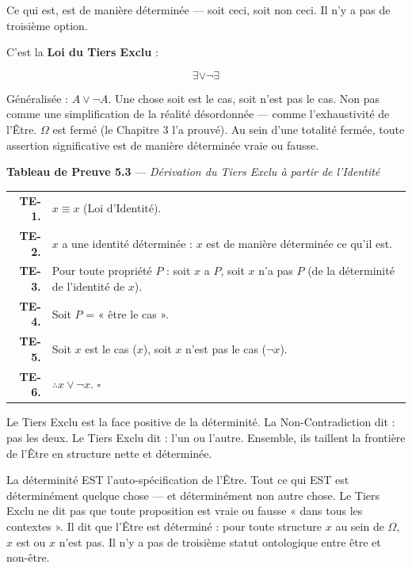 \documentclass[10pt, openany, oneside]{book}
\renewcommand{\footnotesize}{\fontsize{8.5}{11}\selectfont}
\begin{document}
\vspace{1em}

\noindent Ce qui est, est de manière déterminée --- soit ceci, soit non ceci. Il n'y a pas de troisième option.

C'est la \textbf{Loi du Tiers Exclu} :

$$\exists \vee \neg\exists$$

Généralisée : $A \vee \neg A$. Une chose soit est le cas, soit n'est pas le cas. Non pas comme une simplification de la réalité désordonnée --- comme l'exhaustivité de l'Être. $\Omega$ est fermé (le Chapitre 3 l'a prouvé). Au sein d'une totalité fermée, toute assertion significative est de manière déterminée vraie ou fausse.

\vspace{0.5em}

\textbf{Tableau de Preuve 5.3} --- \textit{Dérivation du Tiers Exclu à partir de l'Identité}

\vspace{0.5em}

{\footnotesize
\noindent\begin{tabular}{r p{}}
\textbf{TE-1.} & $x \equiv x$ (Loi d'Identité). \\[0.3em]
\textbf{TE-2.} & $x$ a une identité déterminée : $x$ est de manière déterminée ce qu'il est. \\[0.3em]
\textbf{TE-3.} & Pour toute propriété $P$ : soit $x$ a $P$, soit $x$ n'a pas $P$ (de la déterminité de l'identité de $x$). \\[0.3em]
\textbf{TE-4.} & Soit $P$ = « être le cas ». \\[0.3em]
\textbf{TE-5.} & Soit $x$ est le cas ($x$), soit $x$ n'est pas le cas ($\neg x$). \\[0.3em]
\textbf{TE-6.} & $\therefore x \vee \neg x$. $\square$ \\[0.3em]
\end{tabular}
}

\vspace{0.8em}

\noindent Le Tiers Exclu est la face positive de la déterminité. La Non-Contradiction dit : pas les deux. Le Tiers Exclu dit : l'un ou l'autre. Ensemble, ils taillent la frontière de l'Être en structure nette et déterminée.

La déterminité EST l'auto-spécification de l'Être. Tout ce qui EST est déterminément quelque chose --- et déterminément non autre chose. Le Tiers Exclu ne dit pas que toute proposition est vraie ou fausse « dans tous les contextes ». Il dit que l'Être est déterminé : pour toute structure $x$ au sein de $\Omega$, $x$ est ou $x$ n'est pas. Il n'y a pas de troisième statut ontologique entre être et non-être.
\end{document}
